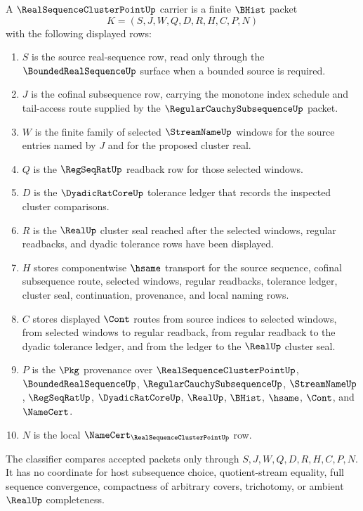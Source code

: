 \begin{definition}\label{def:real-sequence-cluster-point-carrier}
A $\RealSequenceClusterPointUp$ carrier is a finite $\BHist$ packet
$$
K=(S,J,W,Q,D,R,H,C,P,N)
$$
with the following displayed rows:
\begin{enumerate}
\item $S$ is the source real-sequence row, read only through the $\BoundedRealSequenceUp$ surface when a bounded source is required.
\item $J$ is the cofinal subsequence row, carrying the monotone index schedule and tail-access route supplied by the $\RegularCauchySubsequenceUp$ packet.
\item $W$ is the finite family of selected $\StreamNameUp$ windows for the source entries named by $J$ and for the proposed cluster real.
\item $Q$ is the $\RegSeqRatUp$ readback row for those selected windows.
\item $D$ is the $\DyadicRatCoreUp$ tolerance ledger that records the inspected cluster comparisons.
\item $R$ is the $\RealUp$ cluster seal reached after the selected windows, regular readbacks, and dyadic tolerance rows have been displayed.
\item $H$ stores componentwise $\hsame$ transport for the source sequence, cofinal subsequence route, selected windows, regular readbacks, tolerance ledger, cluster seal, continuation, provenance, and local naming rows.
\item $C$ stores displayed $\Cont$ routes from source indices to selected windows, from selected windows to regular readback, from regular readback to the dyadic tolerance ledger, and from the ledger to the $\RealUp$ cluster seal.
\item $P$ is the $\Pkg$ provenance over $\RealSequenceClusterPointUp$, $\BoundedRealSequenceUp$, $\RegularCauchySubsequenceUp$, $\StreamNameUp$, $\RegSeqRatUp$, $\DyadicRatCoreUp$, $\RealUp$, $\BHist$, $\hsame$, $\Cont$, and $\NameCert$.
\item $N$ is the local $\NameCert_{\RealSequenceClusterPointUp}$ row.
\end{enumerate}
The classifier compares accepted packets only through $S,J,W,Q,D,R,H,C,P,N$. It has no coordinate for host subsequence choice, quotient-stream equality, full sequence convergence, compactness of arbitrary covers, trichotomy, or ambient $\RealUp$ completeness.
\end{definition}

